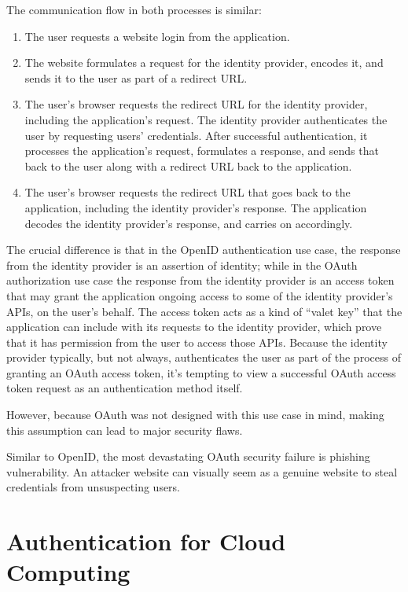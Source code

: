 \begin{multicols}{2}
The communication flow in both processes is similar:
\begin{enumerate}
\item The user requests a website login from the application.
\item The website formulates a request for the identity provider, encodes it, and sends it to the user as part of a redirect URL.
\item The user's browser requests the redirect URL for the identity provider, including the application's request. The identity provider authenticates the user by requesting users' credentials. After successful authentication, it processes the application's request, formulates a response, and sends that back to the user along with a redirect URL back to the application.
\item The user's browser requests the redirect URL that goes back to the application, including the identity provider's response. The application decodes the identity provider's response, and carries on accordingly. 
\end{enumerate}

The crucial difference is that in the OpenID authentication use case, the response from the identity provider is an assertion of identity; while in the OAuth authorization use case the response from the identity provider is an access token that may grant the application ongoing access to some of the identity provider's APIs, on the user's behalf. The access token acts as a kind of ``valet key'' that the application can include with its requests to the identity provider, which prove that it has permission from the user to access those APIs. Because the identity provider typically, but not always, authenticates the user as part of the process of granting an OAuth access token, it's tempting to view a successful OAuth access token request as an authentication method itself.

However, because OAuth was not designed with this use case in mind, making this assumption can lead to major security flaws.

Similar to OpenID, the most devastating OAuth security failure is phishing vulnerability. An attacker website can visually seem as a genuine website to steal credentials from unsuspecting users.

\section*{Authentication for Cloud Computing}


\end{multicols}
